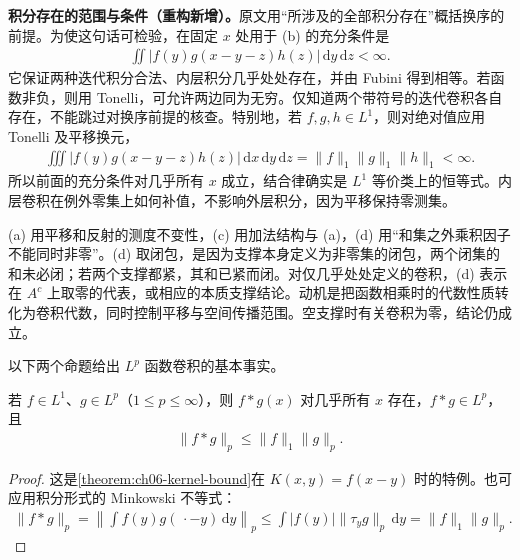 \documentclass[../../main.tex]{subfiles}
\begin{document}
\begin{remark}
\textbf{积分存在的范围与条件（重构新增）。}原文用“所涉及的全部积分存在”概括换序的前提。为使这句话可检验，在固定 $x$ 处用于 (b) 的充分条件是
\begin{align*}
\iint|f(y)g(x-y-z)h(z)|\,\mathrm dy\,\mathrm dz<\infty.
\end{align*}
它保证两种迭代积分合法、内层积分几乎处处存在，并由 Fubini 得到相等。若函数非负，则用 Tonelli，可允许两边同为无穷。仅知道两个带符号的迭代卷积各自存在，不能跳过对换序前提的核查。特别地，若 $f,g,h\in L^1$，则对绝对值应用 Tonelli 及平移换元，
\begin{align*}
\iiint|f(y)g(x-y-z)h(z)|\,\mathrm dx\,\mathrm dy\,\mathrm dz
=\|f\|_1\|g\|_1\|h\|_1<\infty.
\end{align*}
所以前面的充分条件对几乎所有 $x$ 成立，结合律确实是 $L^1$ 等价类上的恒等式。内层卷积在例外零集上如何补值，不影响外层积分，因为平移保持零测集。

(a) 用平移和反射的测度不变性，(c) 用加法结构与 (a)，(d) 用“和集之外乘积因子不能同时非零”。(d) 取闭包，是因为支撑本身定义为非零集的闭包，两个闭集的和未必闭；若两个支撑都紧，其和已紧而闭。对仅几乎处处定义的卷积，(d) 表示在 $A^c$ 上取零的代表，或相应的本质支撑结论。动机是把函数相乘时的代数性质转化为卷积代数，同时控制平移与空间传播范围。空支撑时有关卷积为零，结论仍成立。
\end{remark}
以下两个命题给出 $L^p$ 函数卷积的基本事实。
\begin{theorem}\label{theorem:ch08-young}
若 $f\in L^1$、$g\in L^p$（$1\leqslant p\leqslant\infty$），则 $f*g(x)$ 对几乎所有 $x$ 存在，$f*g\in L^p$，且
\begin{align*}
\|f*g\|_p\leqslant\|f\|_1\|g\|_p.
\end{align*}
\end{theorem}
\begin{proof}
这是\cref{theorem:ch06-kernel-bound}在 $K(x,y)=f(x-y)$ 时的特例。也可应用积分形式的 Minkowski 不等式：
\begin{align*}
\|f*g\|_p
=\left\|\int f(y)g(\,\cdot-y)\,\mathrm dy\right\|_p
\leqslant\int|f(y)|\|\tau_yg\|_p\,\mathrm dy
=\|f\|_1\|g\|_p.
\end{align*}
\end{proof}
\end{document}
